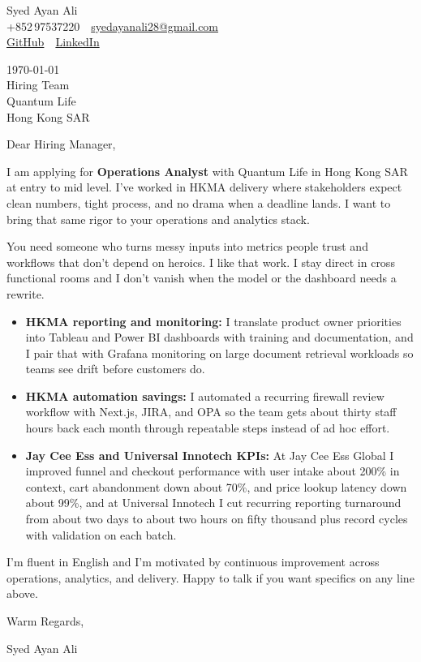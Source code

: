 \documentclass[11pt,a4paper]{article}
\begin{document}
\noindent
Syed Ayan Ali\\
+852\,97537220 \,\textbar\, \href{mailto:syedayanali28@gmail.com}{syedayanali28@gmail.com}\\
\href{https://github.com/syedayanali28}{GitHub} \,\textbar\, \href{https://www.linkedin.com/in/syedayanali/}{LinkedIn}

\vspace{1em}

\noindent
\today\\[0.8em]
Hiring Team\\
Quantum Life\\
Hong Kong SAR

\vspace{1em}

Dear Hiring Manager,

I am applying for \textbf{Operations Analyst} with Quantum Life in Hong Kong SAR at entry to mid level. I've worked in HKMA delivery where stakeholders expect clean numbers, tight process, and no drama when a deadline lands. I want to bring that same rigor to your operations and analytics stack.

You need someone who turns messy inputs into metrics people trust and workflows that don't depend on heroics. I like that work. I stay direct in cross functional rooms and I don't vanish when the model or the dashboard needs a rewrite.

\begin{itemize}
\item \textbf{HKMA reporting and monitoring:} I translate product owner priorities into Tableau and Power BI dashboards with training and documentation, and I pair that with Grafana monitoring on large document retrieval workloads so teams see drift before customers do.

\item \textbf{HKMA automation savings:} I automated a recurring firewall review workflow with Next.js, JIRA, and OPA so the team gets about thirty staff hours back each month through repeatable steps instead of ad hoc effort.

\item \textbf{Jay Cee Ess and Universal Innotech KPIs:} At Jay Cee Ess Global I improved funnel and checkout performance with user intake about 200\% in context, cart abandonment down about 70\%, and price lookup latency down about 99\%, and at Universal Innotech I cut recurring reporting turnaround from about two days to about two hours on fifty thousand plus record cycles with validation on each batch.
\end{itemize}

I'm fluent in English and I'm motivated by continuous improvement across operations, analytics, and delivery. Happy to talk if you want specifics on any line above.

\vspace{1em}

Warm Regards,

\vspace{0.5em}

Syed Ayan Ali
\end{document}
